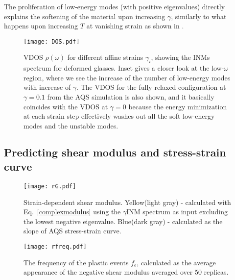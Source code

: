\documentclass[pre,twocolumn,aps,superscriptaddress,showpacs]{revtex4-1}
\begin{document}
The proliferation of low-energy modes (with positive eigenvalues) directly explains the softening of the material upon increasing $\gamma$, similarly to what happens upon increasing $T$ at vanishing strain as shown in \cite{Prediction2018}.\\

\begin{figure}
\centering
  \texttt{[image: DOS.pdf]}
\caption{VDOS $\rho(\omega)$ for different affine strains $\gamma_i$, showing the INMs spectrum for deformed glasses. Inset gives a closer look at the low-$\omega$ region, where we see the increase of the number of low-energy modes with increase of $\gamma$.
The VDOS for the fully relaxed configuration at $\gamma =0.1$ from the AQS simulation is also shown, and it basically coincides with the VDOS at $\gamma=0$ because the energy minimization at each strain step effectively washes out all the soft low-energy modes and the unstable modes.}
\label{fig:y_VDOS}
\end{figure}

\subsection{Predicting shear modulus and stress-strain curve}

\begin{figure}
  \centering
  \hspace{0.1\textwidth}%
  \centering
  \texttt{[image: rG.pdf]}
\caption{Strain-dependent shear modulus. Yellow(light gray) - calculated with Eq.~\ref{complexmodulus} using the $\gamma$INM spectrum as input excluding the lowest negative eigenvalue. Blue(dark gray) - calculated as the slope of AQS stress-strain curve.}
\label{fig:G_y}


\hspace{0.1\textwidth}%
  \centering
  \texttt{[image: rfreq.pdf]}
\caption{The frequency of the plastic events $f_e$, calculated as the average appearance of the negative shear modulus averaged over 50 replicas. }
\label{fig:G_y3}
\hspace{0.1\textwidth}%
\end{figure}
  
\end{document}

